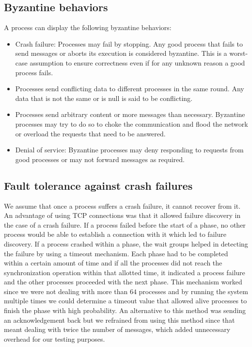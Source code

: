 \subsection{Byzantine behaviors}
\label{sec:behavior}
A process can display the following byzantine behaviors:
\begin{itemize}
    \item Crash failure: Processes may fail by stopping. Any good process that fails to send messages or aborts its execution is considered byzantine. This is a worst-case assumption to ensure correctness even if for any unknown reason a good process fails.
    \item Processes send conflicting data to different processes in the same round. Any data that is not the same or is null is said to be conflicting.
    \item Processes send arbitrary content or more messages than necessary. Byzantine processes may try to do so to choke the communication and flood the network or overload the requests that need to be answered.
    \item Denial of service: Byzantine processes may deny responding to requests from good processes or may not forward messages as required. 
\end{itemize}

\subsection{Fault tolerance against crash failures}
We assume that once a process suffers a crash failure, it cannot recover from it. An advantage of using TCP connections was that it allowed failure discovery in the case of a crash failure. If a process failed before the start of a phase, no other process would be able to establish a connection with it which led to failure discovery. If a process crashed within a phase, the wait groups helped in detecting the failure by using a timeout mechanism. Each phase had to be completed within a certain amount of time and if all the processes did not reach the synchronization operation within that allotted time, it indicated a process failure and the other processes proceeded with the next phase. This mechanism worked since we were not dealing with more than $64$ processes and by running the system multiple times we could determine a timeout value that allowed alive processes to finish the phase with high probability. An alternative to this method was sending an acknowledgement back but we refrained from using this method since that meant dealing with twice the number of messages, which added unnecessary overhead for our testing purposes. 

